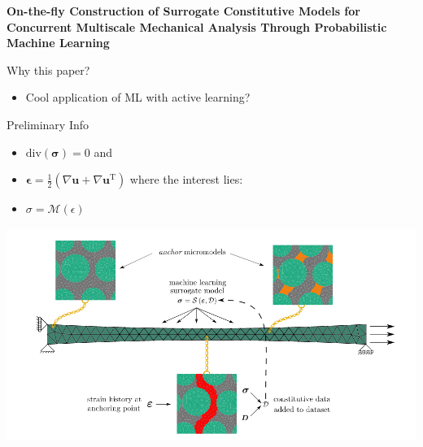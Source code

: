 \documentclass[aspectratio=169]{beamer}
\author{\authorlabel}
\newcommand{\mysubtitle}{\color{Pink}\Large{\textbf{On-the-fly Construction of Surrogate Constitutive Models for Concurrent Multiscale Mechanical Analysis Through Probabilistic Machine Learning}}}
\begin{document}



\begin{frame}
  \centering
  \mysubtitle\cite{rocha2021}
\end{frame}

\begin{frame}{Why this paper?}
  \centering
  \begin{itemize}
    \item Cool application of ML with active learning?
  \end{itemize}
\end{frame}


\begin{frame}{Preliminary Info}
  \begin{minipage}{0.5\textwidth}
    \color{Pink}{Multiscale Modeling}\color{Black}
    \begin{itemize}
      \item $\text{div}(\boldsymbol{\sigma})=0$ and 
      \item $\boldsymbol{\epsilon}=\frac{1}{2}(\nabla\textbf{u} + \nabla\textbf{u}^\text{T}) $ where the interest lies:
      \item $\sigma = \mathcal{M}(\epsilon)$
  \end{itemize}
  \end{minipage}%
  \begin{minipage}{0.5\textwidth}
    \centering
    \includegraphics[width=1.1\textwidth]{Figures/anchor}
  \end{minipage}
\end{frame}
\end{document}
